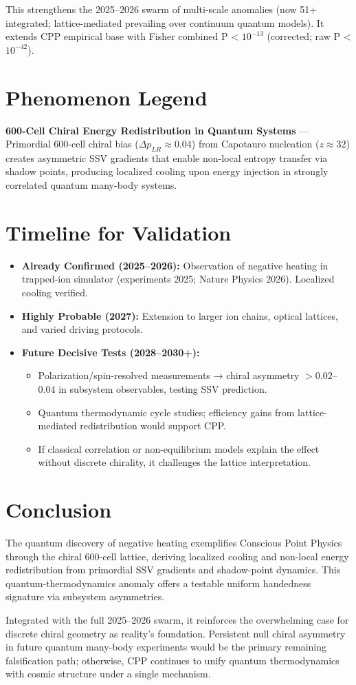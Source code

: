 \documentclass[11pt]{article}
\begin{document}
This strengthens the 2025--2026 swarm of multi-scale anomalies (now 51+ integrated; lattice-mediated prevailing over continuum quantum models). It extends CPP empirical base with Fisher combined P < $10^{-13}$ (corrected; raw P < $10^{-42}$).

\section{Phenomenon Legend}
\textbf{600-Cell Chiral Energy Redistribution in Quantum Systems} — Primordial 600-cell chiral bias ($\Delta p_{LR} \approx 0.04$) from Capotauro nucleation ($z \approx 32$) creates asymmetric SSV gradients that enable non-local entropy transfer via shadow points, producing localized cooling upon energy injection in strongly correlated quantum many-body systems.

\section{Timeline for Validation}
\begin{itemize}
    \item \textbf{Already Confirmed (2025--2026):} Observation of negative heating in trapped-ion simulator (experiments 2025; Nature Physics 2026). Localized cooling verified.
    \item \textbf{Highly Probable (2027):} Extension to larger ion chains, optical lattices, and varied driving protocols.
    \item \textbf{Future Decisive Tests (2028--2030+):}
    \begin{itemize}
        \item Polarization/spin-resolved measurements → chiral asymmetry $>0.02$--$0.04$ in subsystem observables, testing SSV prediction.
        \item Quantum thermodynamic cycle studies; efficiency gains from lattice-mediated redistribution would support CPP.
        \item If classical correlation or non-equilibrium models explain the effect without discrete chirality, it challenges the lattice interpretation.
    \end{itemize}
\end{itemize}

\section{Conclusion}
The quantum discovery of negative heating exemplifies Conscious Point Physics through the chiral 600-cell lattice, deriving localized cooling and non-local energy redistribution from primordial SSV gradients and shadow-point dynamics. This quantum-thermodynamics anomaly offers a testable uniform handedness signature via subsystem asymmetries.  

Integrated with the full 2025--2026 swarm, it reinforces the overwhelming case for discrete chiral geometry as reality's foundation. Persistent null chiral asymmetry in future quantum many-body experiments would be the primary remaining falsification path; otherwise, CPP continues to unify quantum thermodynamics with cosmic structure under a single mechanism.
\end{document}
